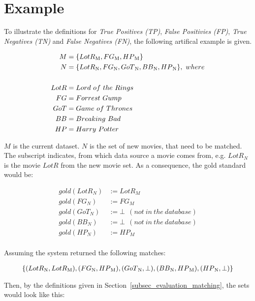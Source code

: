 
\section{Example}
\label{appendix_example}

To illustrate the definitions for \emph{True Positives (TP)}, \emph{False Positivies (FP)}, \emph{True Negatives (TN)} and \emph{False Negatives (FN)}, the following artifical example is given.

\begin{align*}
M &= \{LotR\textsubscript{M}, FG\textsubscript{M}, HP\textsubscript{M}\} \\
N &= \{LotR\textsubscript{N}, FG\textsubscript{N}, GoT\textsubscript{N}, BB\textsubscript{N}, HP\textsubscript{N}\},~where \\
\\
LotR &= Lord~of~the~Rings \\
FG &= Forrest~Gump \\
GoT &= Game~of~Thrones \\
BB &= Breaking~Bad \\
HP &= Harry~Potter
\end{align*}

$M$ is the current dataset. $N$ is the set of new movies, that need to be matched. The subscript indicates, from which data source a movie comes from, e.g. $LotR_N$ is the movie $LotR$ from the new movie set.
As a consequence, the gold standard would be:

\begin{align*}
gold(LotR_N) &:= LotR_M \\
gold(FG_N) &:= FG_M \\
gold(GoT_N) &:= \bot~~(not~in~the~database) \\
gold(BB_N) &:= \bot~~(not~in~the~database) \\
gold(HP_N) &:= HP_M \\
\end{align*}

Assuming the system returned the following matches:

\begin{align*}
\{ (LotR\textsubscript{N}, LotR\textsubscript{M}),
(FG\textsubscript{N}, HP\textsubscript{M}),
(GoT\textsubscript{N}, \mathbf{\bot}),
(BB\textsubscript{N}, HP\textsubscript{M}),
(HP\textsubscript{N}, \mathbf{\bot}) \}
\end{align*}

Then, by the definitions given in Section~\ref{subsec_evaluation_matching}, the sets would look like this:

